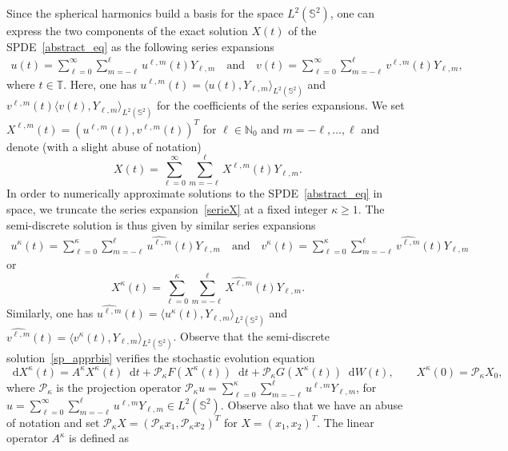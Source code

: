 \documentclass[a4paper]{amsart}
\theoremstyle{remark}
\theoremstyle{definition}
\newcommand{\IS}{\mathbb{S}}
\newcommand*\dd{\mathop{}\!\mathrm{d}}
\newcommand{\IT}{\mathbb{T}}
\begin{document}
Since the spherical harmonics build a basis for the space $L^2(\IS^2)$, one can express the two components of the exact solution $X(t)$ of the SPDE~\eqref{abstract_eq} as the following series expansions
\begin{align}\label{serieX}
u(t)=\sum_{\ell=0}^\infty\sum_{m=-\ell}^\ell u^{\ell,m}(t)Y_{\ell, m}\quad\text{and}\quad 
v(t)=\sum_{\ell=0}^\infty\sum_{m=-\ell}^\ell v^{\ell,m}(t)Y_{\ell, m}, 
\end{align}
where $t\in\IT$. Here, one has $u^{\ell,m}(t)=\langle u(t), Y_{\ell,m}\rangle_{L^2(\IS^2)}$ and $v^{\ell,m}(t)\langle v(t), Y_{\ell,m}\rangle_{L^2(\IS^2)}$ for the coefficients of the series expansions.
We set $X^{\ell,m}(t)=\left(u^{\ell,m}(t),v^{\ell,m}(t)\right)^T$ for $\ell\in \mathbb{N}_0$ and $m=-\ell,\dots,\ell$ and denote (with a slight abuse of notation)
\begin{equation}
\label{serieXbis}
X(t)=\sum_{\ell=0}^{\infty}\sum_{m=-\ell}^{\ell} {X}^{\ell,m}(t)Y_{\ell,m}.
\end{equation}
In order to numerically approximate solutions to the SPDE~\eqref{abstract_eq} in space, we truncate the series expansion~\eqref{serieX} at a fixed integer $\kappa\ge 1$. The semi-discrete solution is thus given by similar series expansions
\begin{align}\label{sp_appr}
u^\kappa(t)=\sum_{\ell=0}^\kappa\sum_{m=-\ell}^\ell \widehat{u^{\ell,m}}(t)Y_{\ell, m}\quad\text{and}\quad 
v^\kappa(t)=\sum_{\ell=0}^\kappa\sum_{m=-\ell}^\ell \widehat{v^{\ell,m}}(t)Y_{\ell, m}
\end{align}
or 
\begin{equation}
\label{sp_apprbis}
X^\kappa(t)=\sum_{\ell=0}^{\kappa}\sum_{m=-\ell}^{\ell} 
\widehat{X^{\ell,m}}(t)Y_{\ell,m}.
\end{equation}
Similarly, one has $\widehat{u^{\ell,m}}(t)=\langle u^\kappa(t),Y_{\ell,m}\rangle_{L^2(\IS^2)}$ and $\widehat{v^{\ell,m}}(t)=\langle v^\kappa(t),Y_{\ell,m}\rangle_{L^2(\IS^2)}$. 
Observe that the semi-discrete solution~\eqref{sp_apprbis} verifies the stochastic evolution equation 
\begin{equation}
\label{abstract_spectral}
\dd X^\kappa(t)=A^\kappa X^\kappa(t)\dd t+\mathcal{P}_\kappa F(X^\kappa(t))\dd t+\mathcal{P}_\kappa G(X^\kappa(t))\dd W(t), \qquad X^\kappa(0)=\mathcal{P}_\kappa X_0,
\end{equation}
where $\mathcal{P}_\kappa$ is the projection operator $\mathcal{P}_\kappa u=\sum_{\ell=0}^{\kappa}\sum_{m=-\ell}^{\ell} u^{\ell,m}Y_{\ell,m}$, 
for $u=\sum_{\ell=0}^{\infty}\sum_{m=-\ell}^{\ell} u^{\ell,m}Y_{\ell,m}\in L^2(\mathbb{S}^2)$. Observe also that we have an abuse of notation and set $\mathcal{P}_\kappa X=\left(\mathcal{P}_\kappa x_1,\mathcal{P}_\kappa x_2\right)^T$ for $X=(x_1,x_2)^T$. The linear operator $A^\kappa$ is defined as 
\end{document}
